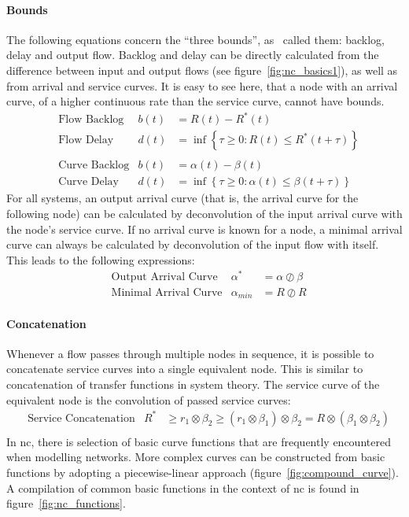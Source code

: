 \paragraph{Bounds}
The following equations concern the \enquote{three bounds}, as~\citeauthor{thiran_network_2001} called them: backlog, delay and output flow.
Backlog and delay can be directly calculated from the difference between input and output flows (see figure~\ref{fig:nc_basics1}), as well as from
arrival and service curves. It is easy to see here, that a node with an arrival curve, of a higher continuous rate than the service curve, cannot have bounds.
%
\begin{equation}
\begin{aligned}
&\text{Flow Backlog} &b(t) &= R(t) - R^*(t)\\[8pt]
&\text{Flow Delay} &d(t) &= \inf\left\{\tau \ge 0 : R(t) \le R^*(t+\tau) \right\}\\
\\
&\text{Curve Backlog} &b(t) &= \alpha(t) - \beta(t)\\[8pt]
&\text{Curve Delay} &d(t) &= \inf\left\{\tau \ge 0 : \alpha(t) \le \beta(t+\tau) \right\}
\end{aligned}
\end{equation}
%
For all systems, an output arrival curve (that is, the arrival curve for the following node) can be calculated by deconvolution
of the input arrival curve with the node's service curve. If no arrival curve is known for a node, a minimal arrival curve can
always be calculated by deconvolution of the input flow with itself.
This leads to the following expressions:
%
\begin{equation}
\begin{aligned}
&\text{Output Arrival Curve} &\alpha^* &= \alpha \oslash \beta\\[8pt]
&\text{Minimal Arrival Curve} &\alpha_{min} &= R \oslash R
\label{eq:nc_outp_arr}
\end{aligned}
\end{equation}
%
\paragraph{Concatenation}
Whenever a flow passes through multiple nodes in sequence, it is possible to concatenate service curves into a single equivalent node. This is similar to concatenation of transfer functions in system theory.
The service curve of the equivalent node is the convolution of passed service curves: 
%
\begin{equation}
\begin{aligned}
&\text{Service Concatenation} &R^* &\ge r_1 \otimes \beta_2 \ge (r_1 \otimes \beta_1) \otimes \beta_2 = R \otimes (\beta_1 \otimes \beta_2)\\
\end{aligned}
\end{equation}
%
In \gls{nc}, there is selection of basic curve functions that are frequently encountered when modelling networks. More complex curves can be constructed from basic functions
by adopting a piecewise-linear approach (figure~\ref{fig:compound_curve}). A compilation of common basic functions in the context of \gls{nc} is found in figure~\ref{fig:nc_functions}.

